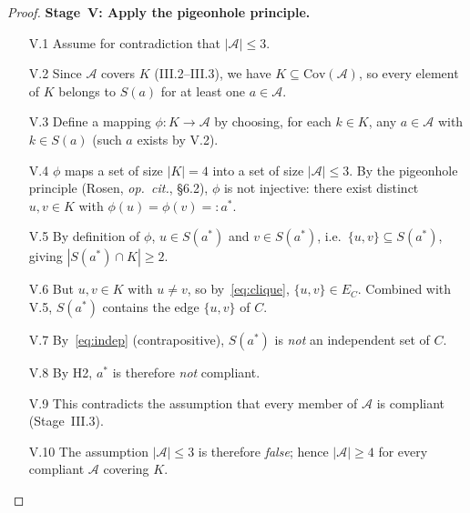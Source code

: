 \documentclass[12pt]{article}
\theoremstyle{definition}
\begin{document}
\begin{proof}
\medskip
\noindent\textbf{Stage~V: Apply the pigeonhole principle.}
\begin{enumerate}
    \item[V.1] Assume for contradiction that $|\mathcal{A}| \leq 3$.
    \item[V.2] Since $\mathcal{A}$ covers $K$ (III.2--III.3), we have
               $K \subseteq \mathrm{Cov}(\mathcal{A})$, so every
               element of $K$ belongs to $S(a)$ for at least one
               $a \in \mathcal{A}$.
    \item[V.3] Define a mapping $\phi: K \to \mathcal{A}$ by choosing,
               for each $k \in K$, any $a \in \mathcal{A}$ with
               $k \in S(a)$ (such $a$ exists by V.2).
    \item[V.4] $\phi$ maps a set of size $|K|=4$ into a set of size
               $|\mathcal{A}| \leq 3$.
               By the pigeonhole principle (Rosen, \emph{op.\ cit.},
               \S6.2), $\phi$ is not injective: there exist distinct
               $u, v \in K$ with $\phi(u) = \phi(v) =: a^*$.
    \item[V.5] By definition of $\phi$, $u \in S(a^*)$ and
               $v \in S(a^*)$, i.e.\ $\{u,v\} \subseteq S(a^*)$,
               giving $|S(a^*) \cap K| \geq 2$.
    \item[V.6] But $u, v \in K$ with $u \neq v$, so
               by~\eqref{eq:clique}, $\{u,v\} \in E_C$.
               Combined with V.5, $S(a^*)$ contains the edge
               $\{u,v\}$ of $C$.
    \item[V.7] By~\eqref{eq:indep} (contrapositive), $S(a^*)$ is
               \emph{not} an independent set of $C$.
    \item[V.8] By H2, $a^*$ is therefore \emph{not} compliant.
    \item[V.9] This contradicts the assumption that every member of
               $\mathcal{A}$ is compliant (Stage~III.3).
    \item[V.10] The assumption $|\mathcal{A}| \leq 3$ is therefore
                \emph{false}; hence $|\mathcal{A}| \geq 4$ for every
                compliant $\mathcal{A}$ covering $K$.
\end{enumerate}


\end{proof}
\end{document}
